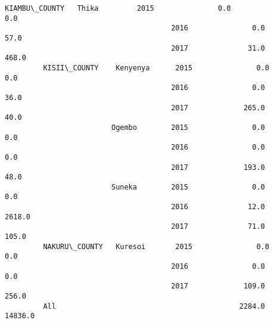 \documentclass[11pt]{article}
\begin{document}
\begin{Verbatim}[commandchars=\\\{\}]
         KIAMBU\_COUNTY   Thika         2015               0.0                  0.0   
                                       2016               0.0                 57.0   
                                       2017              31.0                468.0   
         KISII\_COUNTY    Kenyenya      2015               0.0                  0.0   
                                       2016               0.0                 36.0   
                                       2017             265.0                 40.0   
                         Ogembo        2015               0.0                  0.0   
                                       2016               0.0                  0.0   
                                       2017             193.0                 48.0   
                         Suneka        2015               0.0                  0.0   
                                       2016              12.0               2618.0   
                                       2017              71.0                105.0   
         NAKURU\_COUNTY   Kuresoi       2015               0.0                  0.0   
                                       2016               0.0                  0.0   
                                       2017             109.0                256.0   
         All                                           2284.0              14836.0   
         

\end{Verbatim}
\end{document}

